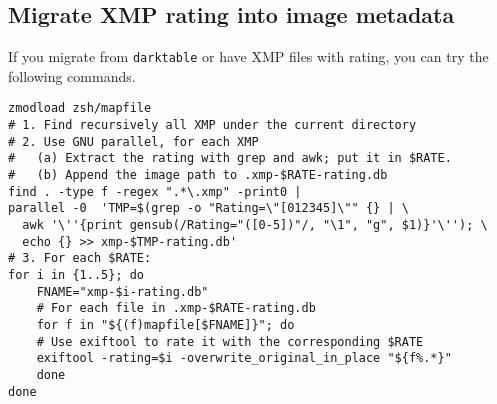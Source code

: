 \documentclass[11pt]{article}
\begin{document}
\subsection{Migrate XMP rating into image metadata}
\label{sec:orgcff369a}
If you migrate from \texttt{darktable} or have XMP files with rating, you can try the following commands. 


\begin{verbatim}
zmodload zsh/mapfile
# 1. Find recursively all XMP under the current directory
# 2. Use GNU parallel, for each XMP 
#   (a) Extract the rating with grep and awk; put it in $RATE.
#   (b) Append the image path to .xmp-$RATE-rating.db
find . -type f -regex ".*\.xmp" -print0 | 
parallel -0  'TMP=$(grep -o "Rating=\"[012345]\"" {} | \
  awk '\''{print gensub(/Rating="([0-5])"/, "\1", "g", $1)}'\''); \
  echo {} >> xmp-$TMP-rating.db' 
# 3. For each $RATE: 
for i in {1..5}; do
    FNAME="xmp-$i-rating.db"
    # For each file in .xmp-$RATE-rating.db
    for f in "${(f)mapfile[$FNAME]}"; do   
	# Use exiftool to rate it with the corresponding $RATE
	exiftool -rating=$i -overwrite_original_in_place "${f%.*}"
    done 
done
\end{verbatim}
\end{document}
